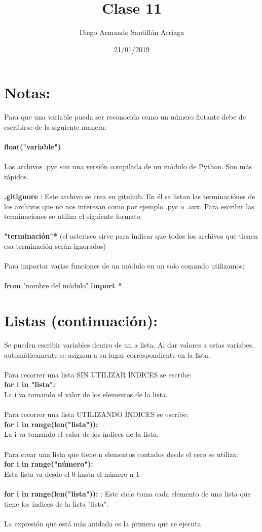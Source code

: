 \documentclass[letter paper, 12pt, oneside]{article}
\title{\Huge Clase 11}
\author{Diego Armando Santillán Arriaga}
\date{21/01/2019}
\begin{document}
	\maketitle	
\newpage
\section{Notas:}
Para que una variable pueda ser reconocida como un número flotante debe de escribirse de la siguiente manera:
\\\\
\textbf{float("variable")}
\\\\
Los archivos .pyc son una versión compilada de un módulo de Python. Son más rápidos. 
\\\\
\textbf{.gitignore} : Este archivo se crea en gituhub. En él se listan las terminaciónes de los archivos que no nos interesan como por ejemplo .pyc o .aux. Para escribir las terminaciones se utiliza el siguiente formato:
\\\\
\textbf{"terminación"*} (el asterisco sirve para indicar que todos los archivos que tienen esa terminación serán ignorados)
\\\\
Para importar varias funciones de un módulo en un solo comando utilizamos:
\\\\
\textbf{from} "nombre del módulo" \textbf{import *} 


\section{Listas (continuación):}
Se pueden escribir variables dentro de un a lista. Al dar valores a estas variabes, automáticamente se asignan a su lugar correspondiente en la lista. 
\\\\
Para recorrer una lista SIN UTILIZAR ÍNDICES se escribe:
\\
\textbf{for i in "lista":}
\\
La i va tomando el valor de los elementos de la lista.
\\\\
Para recorrer una lista UTILIZANDO ÍNDICES se escribe:
\\
\textbf{for i in range(len("lista")):}
\\
La i va tomando el valor de los índices de la lista.
\\\\
Para crear una lista que tiene n elementos contados desde el cero se  utiliza:
\\
\textbf{for i in range("número"):}
\\
Esta lista va desde el 0 hasta el número n-1 
\\\\
\textbf{for i in  range(len("lista")):} :
Este ciclo toma cada elemento de una lista que tiene los índices de la lista "lista".
\\\\
La expresión que está más anidada es la primera que se ejecuta
\end{document}
